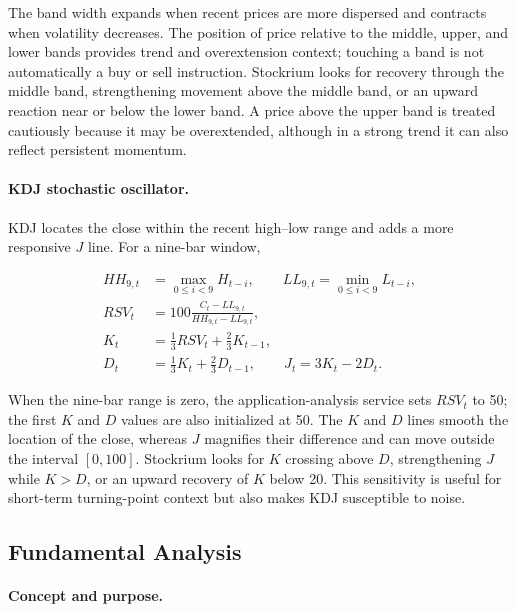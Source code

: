 The band width expands when recent prices are more dispersed and contracts when volatility decreases. The position of price relative to the middle, upper, and lower bands provides trend and overextension context; touching a band is not automatically a buy or sell instruction. Stockrium looks for recovery through the middle band, strengthening movement above the middle band, or an upward reaction near or below the lower band. A price above the upper band is treated cautiously because it may be overextended, although in a strong trend it can also reflect persistent momentum.

\paragraph{KDJ stochastic oscillator.}

KDJ locates the close within the recent high--low range and adds a more responsive $J$ line. For a nine-bar window,

\begin{align}
    HH_{9,t}&=\max_{0\leq i<9} H_{t-i}, \qquad
    LL_{9,t}=\min_{0\leq i<9} L_{t-i}, \\
    RSV_t&=100\frac{C_t-LL_{9,t}}{HH_{9,t}-LL_{9,t}}, \\
    K_t&=\frac{1}{3}RSV_t+\frac{2}{3}K_{t-1}, \\
    D_t&=\frac{1}{3}K_t+\frac{2}{3}D_{t-1}, \qquad
    J_t=3K_t-2D_t.
    \label{eq:technical-kdj}
\end{align}

When the nine-bar range is zero, the application-analysis service sets $RSV_t$ to 50; the first $K$ and $D$ values are also initialized at 50. The $K$ and $D$ lines smooth the location of the close, whereas $J$ magnifies their difference and can move outside the interval $[0,100]$. Stockrium looks for $K$ crossing above $D$, strengthening $J$ while $K>D$, or an upward recovery of $K$ below 20. This sensitivity is useful for short-term turning-point context but also makes KDJ susceptible to noise.

\subsection{Fundamental Analysis}
\label{subsec:fundamental-analysis-foundations}

\paragraph{Concept and purpose.}

